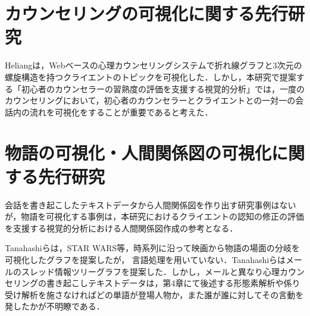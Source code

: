\documentclass[shuuron]{kuee}
\begin{document}





\section{カウンセリングの可視化に関する先行研究}%

Heliang\cite{shou}は，Webベースの心理カウンセリングシステムで折れ線グラフと3次元の螺旋構造を持つクライエントのトピックを可視化した．しかし，本研究で提案する「初心者のカウンセラーの習熟度の評価を支援する視覚的分析」では，一度のカウンセリングにおいて，初心者のカウンセラーとクライエントとの一対一の会話内の流れを可視化をすることが重要であると考えた．

\section{物語の可視化・人間関係図の可視化に関する先行研究}%

会話を書き起こしたテキストデータから人間関係図を作り出す研究事例はないが，物語を可視化する事例は，本研究におけるクライエントの認知の修正の評価を支援する視覚的分析における人間関係図作成の参考となる．

Tanahashiら\cite{tanahashi2012design}は，STAR WARS等，時系列に沿って映画から物語の場面の分岐を可視化したグラフを提案したが，
言語処理を用いていない．Tanahashiら\cite{tanahashi2015efficient}はメールのスレッド情報ツリーグラフを提案した．しかし，メールと異なり心理カウンセリングの書き起こしテキストデータは，第4章にて後述する形態素解析や係り受け解析を施さなければどの単語が登場人物か，また誰が誰に対してその言動を発したかが不明瞭である．
\end{document}
